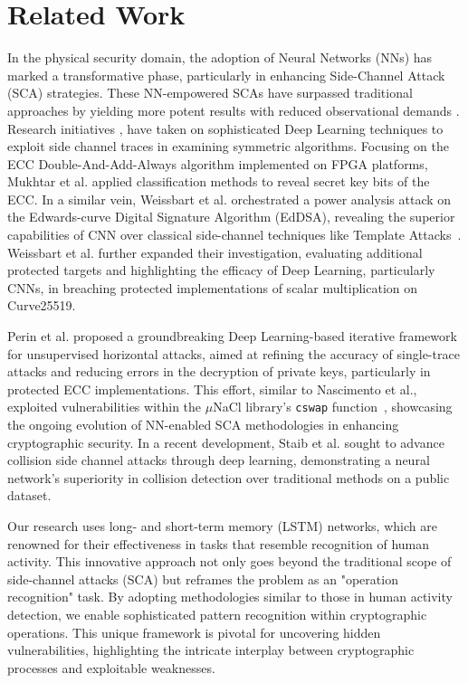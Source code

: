 \section{Related Work}
In the physical security domain, the adoption of Neural Networks (NNs) has marked a transformative phase, particularly in enhancing Side-Channel Attack (SCA) strategies. These NN-empowered SCAs have surpassed traditional approaches by yielding more potent results with reduced observational demands \cite{maghrebi2016breaking,picek2017side,wang2014learning,wu2021best,perin2021keep,nascimento2017applying,weissbart2019one,cagli2017convolutional,zaid2020methodology,carbone2019deep,picek2021sok}. Research initiatives \cite{maghrebi2019deep,ramezanpour2020scaul,benadjila2020deep}, have taken on sophisticated Deep Learning techniques to exploit side channel traces in examining symmetric algorithms. Focusing on the ECC Double-And-Add-Always algorithm implemented on FPGA platforms, Mukhtar et al.\cite{mukhtar2018machine} applied classification methods to reveal secret key bits of the ECC. In a similar vein, Weissbart et al.\cite{weissbart2019one} orchestrated a power analysis attack on the Edwards-curve Digital Signature Algorithm (EdDSA)\cite{bernstein2012high}, revealing the superior capabilities of CNN over classical side-channel techniques like Template Attacks~\cite{chari2002template}. Weissbart et al.\cite{weissbart2020systematic} further expanded their investigation, evaluating additional protected targets and highlighting the efficacy of Deep Learning, particularly CNNs, in breaching protected implementations of scalar multiplication on Curve25519\cite{bernstein2006curve25519}.

Perin et al.\cite{perin2021keep} proposed a groundbreaking Deep Learning-based iterative framework for unsupervised horizontal attacks, aimed at refining the accuracy of single-trace attacks and reducing errors in the decryption of private keys, particularly in protected ECC implementations. This effort, similar to Nascimento et al.\cite{nascimento2017applying}, exploited vulnerabilities within the $\mu$NaCl library's \texttt{cswap} function~\cite{NACLlib}, showcasing the ongoing evolution of NN-enabled SCA methodologies in enhancing cryptographic security. In a recent development, Staib et al.\cite{staib2023deep} sought to advance collision side channel attacks through deep learning, demonstrating a neural network's superiority in collision detection over traditional methods on a public dataset\cite{luo2018effective,clavier2011improved,bauer2015horizontal}. 

Our research uses long- and short-term memory (LSTM) networks, which are renowned for their effectiveness in tasks that resemble recognition of human activity. This innovative approach not only goes beyond the traditional scope of side-channel attacks (SCA) but reframes the problem as an "operation recognition" task. By adopting methodologies similar to those in human activity detection, we enable sophisticated pattern recognition within cryptographic operations. This unique framework is pivotal for uncovering hidden vulnerabilities, highlighting the intricate interplay between cryptographic processes and exploitable weaknesses.